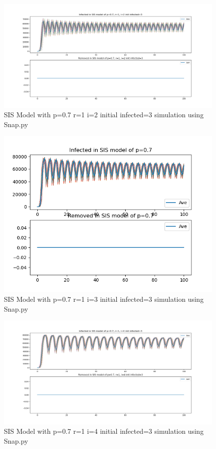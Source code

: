 \documentclass{subfile}
\begin{document}
  \begin{figure}
  \includegraphics[scale=0.8]{sisp07r1i2s3}
  \caption[SIS p=0.7,r=1,i=2,init infected=3]{SIS Model with p=0.7 r=1 i=2 initial infected=3 simulation using Snap.py}
  \end{figure}
  \begin{figure}
  \includegraphics[scale=0.8]{sisp07r1i3s3}
  \caption[SIS p=0.7,r=1,i=3,init infected=3]{SIS Model with p=0.7 r=1 i=3 initial infected=3 simulation using Snap.py}
  \end{figure}
  \begin{figure}
  \includegraphics[scale=0.8]{sisp07r1i4s3}
  \caption[SIS p=0.7,r=1,i=4,init infected=3]{SIS Model with p=0.7 r=1 i=4 initial infected=3 simulation using Snap.py}
  \end{figure}
\end{document}
